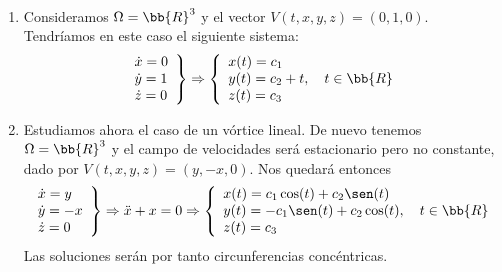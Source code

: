 \begin{ejemplo}\
    \begin{enumerate}
        \item Consideramos $\Omega = \bb{R}^3$ y el vector $V(t,x,y,z) = (0,1,0)$. Tendríamos en este caso el siguiente sistema:
        \begin{gather*}
            \left.
                \begin{array}{l}
                    \dot{x} = 0\\
                    \dot{y} = 1\\
                    \dot{z} = 0
                \end{array}
            \right\} \Rightarrow
            \left\{
                \begin{array}{l}
                    x(t) = c_1\\
                    y(t) = c_2 + t, \ \ \ t\in \bb{R}\\
                    z(t) = c_3
                \end{array}
            \right.
        \end{gather*}

        \item Estudiamos ahora el caso de un vórtice lineal. De nuevo tenemos $\Omega = \bb{R}^3$ y el campo de velocidades será estacionario pero no constante, dado por $V(t,x,y,z) = (y, -x, 0)$. Nos quedará entonces
        \begin{gather*}
            \left.
                \begin{array}{l}
                    \dot{x} = y\\
                    \dot{y} = -x\\
                    \dot{z} = 0
                \end{array}
            \right\} \Rightarrow \ddot{x} + x = 0 \Rightarrow
            \left\{
                \begin{array}{l}
                    x(t) = c_1 \cos(t) + c_2 \sen(t)\\
                    y(t) = -c_1\sen(t) + c_2\cos(t), \ \ \ t\in \bb{R}\\
                    z(t) = c_3
                \end{array}
            \right.
        \end{gather*}
        Las soluciones serán por tanto circunferencias concéntricas.
    \end{enumerate}
\end{ejemplo}


